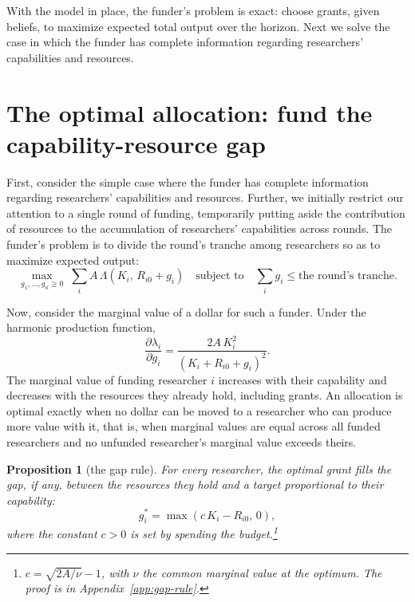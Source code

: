 \documentclass[article, 11pt, reqno]{amsart}
\newtheorem{prop}{Proposition}
\theoremstyle{named}
\begin{document}
With the model in place, the funder's problem is exact: choose grants, given beliefs, to
maximize expected total output over the horizon. Next we solve the case in which the
funder has complete information regarding researchers' capabilities and resources.


\section{The optimal allocation: fund the capability-resource gap}\label{sec:optimal}

First, consider the simple case where the funder has complete information regarding
researchers' capabilities and resources. Further, we initially restrict our attention to a
single round of funding, temporarily putting aside the contribution of resources to the
accumulation of researchers' capabilities across rounds. The funder's problem is to divide
the round's tranche among researchers so as to maximize expected output:
\[
\max_{g_1, \ldots, g_n \geq 0} \; \sum_{i} A\,\Lambda(K_i,\, R_{i0} + g_i)
\quad \text{subject to} \quad \sum_{i} g_i \leq \text{the round's tranche}.
\]

Now, consider the marginal value of a dollar for such a funder. Under the harmonic
production function,
\[
\frac{\partial \lambda_i}{\partial g_i} = \frac{2A\,K_i^2}{(K_i + R_{i0} + g_i)^2}.
\]
The marginal value of funding researcher $i$ increases with their capability and decreases
with the resources they already hold, including grants. An allocation is optimal exactly
when no dollar can be moved to a researcher who can produce more value with it, that is,
when marginal values are equal across all funded researchers and no unfunded researcher's
marginal value exceeds theirs.

\begin{prop}[the gap rule]\label{prop:gap-rule}
For every researcher, the optimal grant fills the gap, if any, between the resources they
hold and a target proportional to their capability:
\[
g_i^* = \max(c\,K_i - R_{i0},\, 0),
\]
where the constant $c > 0$ is set by spending the budget.\footnote{$c = \sqrt{2A/\nu} - 1$,
with $\nu$ the common marginal value at the optimum. The proof is in Appendix~\ref{app:gap-rule}.}
\end{prop}
\end{document}
